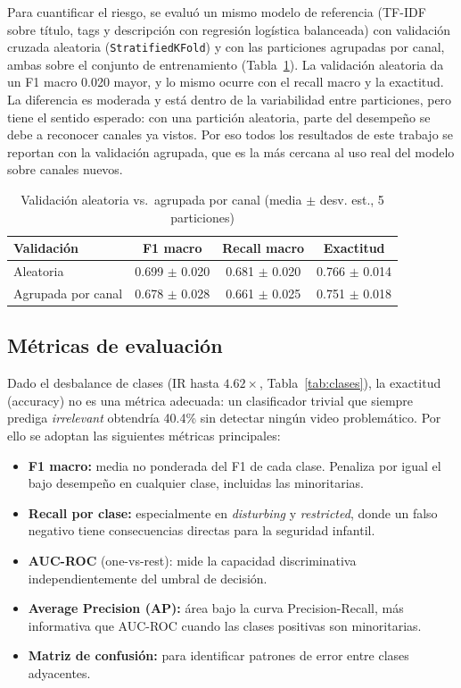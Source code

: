 \documentclass[conference]{IEEEtran}
\begin{document}
Para cuantificar el riesgo, se evaluó un mismo modelo de referencia (TF-IDF sobre título, tags y descripción con regresión logística balanceada) con validación cruzada aleatoria (\texttt{StratifiedKFold}) y con las particiones agrupadas por canal, ambas sobre el conjunto de entrenamiento (Tabla~\ref{tab:leakcv}). La validación aleatoria da un F1 macro 0.020 mayor, y lo mismo ocurre con el recall macro y la exactitud. La diferencia es moderada y está dentro de la variabilidad entre particiones, pero tiene el sentido esperado: con una partición aleatoria, parte del desempeño se debe a reconocer canales ya vistos. Por eso todos los resultados de este trabajo se reportan con la validación agrupada, que es la más cercana al uso real del modelo sobre canales nuevos.

\begin{table}[!t]
\caption{Validación aleatoria vs.\ agrupada por canal (media $\pm$ desv. est., 5 particiones)}
\begin{center}
\footnotesize
\setlength{\tabcolsep}{3pt}
\begin{tabular}{|l|c|c|c|}
\hline
\textbf{Validación} & \textbf{F1 macro} & \textbf{Recall macro} & \textbf{Exactitud} \\
\hline
Aleatoria & 0.699 $\pm$ 0.020 & 0.681 $\pm$ 0.020 & 0.766 $\pm$ 0.014 \\
\hline
Agrupada por canal & 0.678 $\pm$ 0.028 & 0.661 $\pm$ 0.025 & 0.751 $\pm$ 0.018 \\
\hline
\end{tabular}
\label{tab:leakcv}
\end{center}
\end{table}

\subsection{Métricas de evaluación}\label{sec:metricas}
Dado el desbalance de clases (IR hasta $4.62\times$, Tabla~\ref{tab:clases}), la exactitud (accuracy) no es una métrica adecuada: un clasificador trivial que siempre prediga \textit{irrelevant} obtendría 40.4\% sin detectar ningún video problemático. Por ello se adoptan las siguientes métricas principales:

\begin{itemize}
\item \textbf{F1 macro:} media no ponderada del F1 de cada clase. Penaliza por igual el bajo desempeño en cualquier clase, incluidas las minoritarias.
\item \textbf{Recall por clase:} especialmente en \textit{disturbing} y \textit{restricted}, donde un falso negativo tiene consecuencias directas para la seguridad infantil.
\item \textbf{AUC-ROC} (one-vs-rest): mide la capacidad discriminativa independientemente del umbral de decisión.
\item \textbf{Average Precision (AP):} área bajo la curva Precision-Recall, más informativa que AUC-ROC cuando las clases positivas son minoritarias.
\item \textbf{Matriz de confusión:} para identificar patrones de error entre clases adyacentes.
\end{itemize}
\end{document}
